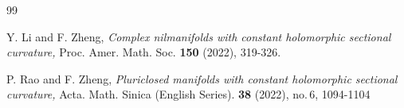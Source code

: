 \documentclass{amsart}
\begin{document}
\begin{thebibliography}{99}









 Y. Li and F. Zheng, \emph{Complex nilmanifolds with constant holomorphic sectional curvature,}  Proc. Amer. Math. Soc. {\bf 150} (2022), 319-326.












 P. Rao and F. Zheng, \emph{ Pluriclosed manifolds with constant holomorphic sectional curvature,} Acta. Math. Sinica (English Series). \textbf{38} (2022), no.\,6,  1094-1104




\end{thebibliography}
\end{document}
